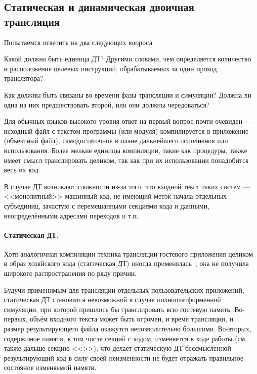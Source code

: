 \subsection[Статическая и динамическая двоичная трансляция]{Статическая и динамическая двоичная трансляция}

Попытаемся ответить на два следующих вопроса.
\begin{enumerate*}
    \item Какой должна быть единица ДТ? Другими словами, чем определяется количество и расположение целевых инструкций, обрабатываемых за один проход транслятора?
    \item Как должны быть связаны во времени фазы трансляции и симуляции? Должна ли одна из них предшествовать второй, или они должны чередоваться?
\end{enumerate*}

Для обычных языков высокого уровня ответ на первый вопрос почти очевиден --- исходный файл с текстом программы (или модуля) компилируется в приложение (объектный файл), самодостаточное в плане дальнейшего исполнения или использования. Более мелкие единицы компиляции, такие как процедуры, также имеет смысл транслировать целиком, так как при их использовании понадобится весь их код. 

В случае ДТ возникают сложности из-за того, что входной текст таких систем --- <<монолитный>> машинный код, не имеющий меток начала отдельных субъединиц, зачастую с перемешанными секциями кода и данными, неопределёнными адресами переходов и т.п.  

\paragraph{Статическая ДТ.} Хотя аналогичная компиляции техника трансляции гостевого приложения целиком в образ хозяйского кода (статическая ДТ) иногда применялась~\cite{Ray97digitalfx32}, она не получила широкого распространения по ряду причин.

Будучи применимым для трансляции отдельных пользовательских приложений, статическая ДТ становится невозможной в случае полноплатформенной симуляции, при которой пришлось бы транслировать всю гостевую память. Во-первых, объём входного текста может быть огромен, и время трансляции, и размер результирующего файла окажутся непозволительно большими. Во-вторых, содержимое памяти, в том числе секций с кодом, изменяется в ходе работы (см. также дальше секцию <<>>), что делает статическую ДТ бессмысленной --- результирующий код в силу своей неизменности не будет отражать правильное состояние изменяемой памяти. 

